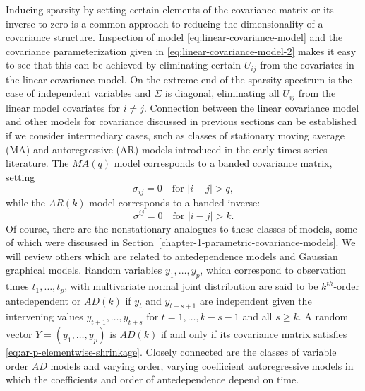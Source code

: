 Inducing sparsity by setting certain elements of the covariance matrix or its inverse to zero is a common approach to reducing the dimensionality of a covariance structure. Inspection of model \eqref{eq:linear-covariance-model} and the covariance parameterization given in \eqref{eq:linear-covariance-model-2} makes it easy to see that this can be achieved by eliminating certain $U_{ij}$ from the covariates in the linear covariance model. On the extreme end of the sparsity spectrum is the case of independent variables and $\Sigma$ is diagonal, eliminating all $U_{ij}$ from the linear model covariates for $i \ne j$. Connection between the linear covariance model and other models for covariance discussed in previous sections can be established if we consider intermediary cases, such as classes of stationary moving average (MA) and autoregressive (AR) models introduced in the early times series literature. The $MA(q)$ model corresponds to a banded covariance matrix, setting 
\begin{equation}  \label{eq:ar-p-elementwise-shrinkage}
\sigma_{ij} = 0 \quad \mbox{for }\vert i - j \vert > q, 
\end{equation}
\noindent
while the $AR(k)$ model corresponds to a banded inverse:
\begin{equation} \label{eq:ar-p-elementwise-shrinkage}
\sigma^{ij} = 0 \quad \mbox{for }\vert i - j \vert > k. 
\end{equation}
Of course, there are the nonstationary analogues to these classes of models, some of which were discussed in Section~\ref{chapter-1-parametric-covariance-models}. We will review others which are related to antedependence models and Gaussian graphical models. Random variables $y_1, \dots, y_p$, which correspond to observation times $t_1,\dots, t_p$, with multivariate normal joint distribution are said to be $k^{th}$-order antedependent or $AD(k)$ \citep{gabriel1962ante} if $y_t$ and $y_{t+s+1}$ are independent given the intervening values $y_{t+1}, \dots , y_{t+s}$ for $t = 1, \dots , k - s - 1$ and all $s \ge k$. A random vector $Y = \left(y_1, \dots , y_p\right)$ is $AD(k)$ if and only if its covariance matrix satisfies \eqref{eq:ar-p-elementwise-shrinkage}. Closely connected are the classes of variable order $AD$ models and varying order, varying coefficient autoregressive models \citep{kitagawa1985smoothness} in which the coefficients and order of antedependence depend on time. 




